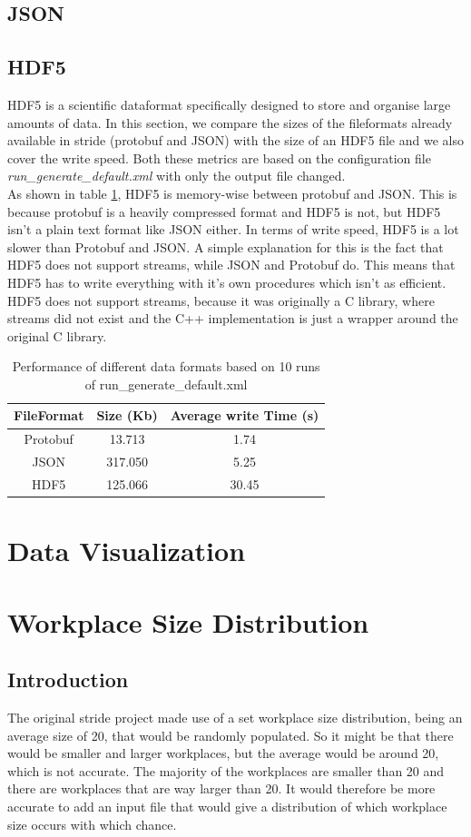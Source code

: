 \documentclass[runningheads]{llncs}
\begin{document}
	\subsection{JSON}
	\subsection{HDF5}
	HDF5 is a scientific dataformat specifically designed to store and organise large amounts of data. In this section, we compare the sizes of the fileformats already available in stride (protobuf and JSON) with the size of an HDF5 file and we also cover the write speed. Both these metrics are based on the configuration file \textit{run\_generate\_default.xml} with only the output file changed.
	\\
	As shown in table \ref{table:1}, HDF5 is memory-wise between protobuf and JSON. This is because protobuf is a heavily compressed format and HDF5 is not, but HDF5 isn't a plain text format like JSON either. In terms of write speed, HDF5 is a lot slower than Protobuf and JSON. A simple explanation for this is the fact that HDF5 does not support streams, while JSON and Protobuf do. This means that HDF5 has to write everything with it's own procedures which isn't as efficient. HDF5 does not support streams, because it was originally a C library, where streams did not exist and the C++ implementation is just a wrapper around the original C library.
	\begin{table}
		\centering
		\begin{tabular}{|c|c|c|}
			\hline
			\textbf{FileFormat} & \textbf{Size (Kb)}  & \textbf{Average write Time (s)}\\ \hline
			Protobuf & 13.713 & 1.74\\ \hline
			JSON & 317.050 & 5.25\\ \hline
			HDF5 & 125.066 & 30.45 \\ \hline
		\end{tabular}
		\caption{Performance of different data formats based on 10 runs of run\_generate\_default.xml}
		\label{table:1}
	\end{table}
	\section{Data Visualization}
	\section{Workplace Size Distribution}
	\subsection{Introduction}
	The original stride project made use of a set workplace size distribution, being an average size of 20, that would be randomly populated. So it might be that there would be smaller and larger workplaces, but the average would be around 20, which is not accurate. The majority of the workplaces are smaller than 20 and there are workplaces that are way larger than 20. It would therefore be more accurate to add an input file that would give a distribution of which workplace size occurs with which chance.
\end{document}
